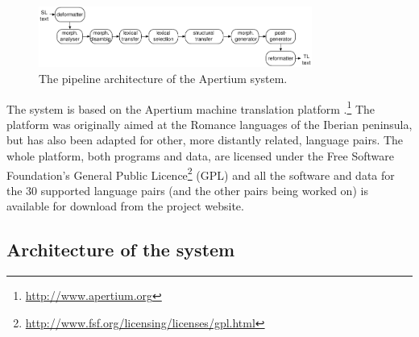 \documentclass[a4paper,11pt]{article}
\begin{document}
\begin{figure}[htbp]
\begin{center}
 \includegraphics[width=0.8\textwidth]{architecture.pdf}
\end{center}
\caption{The pipeline architecture of the Apertium system.}
\label{fig:modules}
\end{figure}

The system is based on the Apertium machine translation 
platform \citep{apertium/2011}.\footnote{\url{http://www.apertium.org}} The 
platform was originally aimed at the Romance languages of the Iberian peninsula, but has also been adapted for 
other, more distantly related, language pairs.
The whole platform, both programs and data, are licensed under the Free Software Foundation's General Public 
Licence\footnote{\url{http://www.fsf.org/licensing/licenses/gpl.html}} (GPL) and all the software and data for the 
30 supported language pairs (and the other pairs being worked on) is available for download from the project 
website.

\subsection{Architecture of the system}
\end{document}
